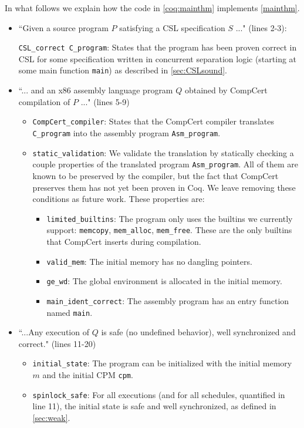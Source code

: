 In what follows we explain how the code in \autoref{coq:mainthm} implements \autoref{mainthm}.
\begin{itemize}
\item ``Given a source program $P$ satisfying a CSL specification $S$ ..." (lines 2-3):

\lstinline{CSL_correct C_program}: States that the program has been proven correct in CSL for some specification written in concurrent separation logic (starting at some main function \lstinline{main}) 
as described in \autoref{sec:CSLsound}.

\item ``... and an x86 assembly language program $Q$ obtained by CompCert compilation of
$P$ ..." (lines 5-9)

\begin{itemize}

\item \lstinline{CompCert_compiler}: States that the CompCert compiler translates 
\lstinline{C_program} into the assembly program \lstinline{Asm_program}.  

\item \lstinline{static_validation}: We validate the translation by statically checking a couple properties of the translated program \lstinline{Asm_program}. 
All of them are known to be preserved by the compiler, but the fact that CompCert preserves them has not yet been proven in Coq. We leave removing these conditions as future work. These properties are:
\begin{itemize}
\item \lstinline{limited_builtins}: The program only uses the builtins we currently support: \lstinline{memcopy}, \lstinline{mem_alloc}, \lstinline{mem_free}. These are the only builtins that CompCert inserts during compilation.
\item \lstinline{valid_mem}: The initial memory has no dangling pointers.
\item \lstinline{ge_wd}: The global environment is allocated in the initial memory. 
\item \lstinline{main_ident_correct}: The assembly program has an entry function named \lstinline{main}.
  
\end{itemize}

\end{itemize}

\item ``...Any execution of $Q$ is safe (no undefined behavior), well
synchronized and correct." (lines 11-20)

\begin{itemize}
\item \lstinline{initial_state}: The program can be initialized with the initial memory $m$ and the initial CPM \lstinline{cpm}.

\item \lstinline{spinlock_safe}: For all executions (and for all schedules, quantified in line 11), the initial state is safe and well synchronized, as defined in \autoref{sec:weak}.

\end{itemize}

\end{itemize}
